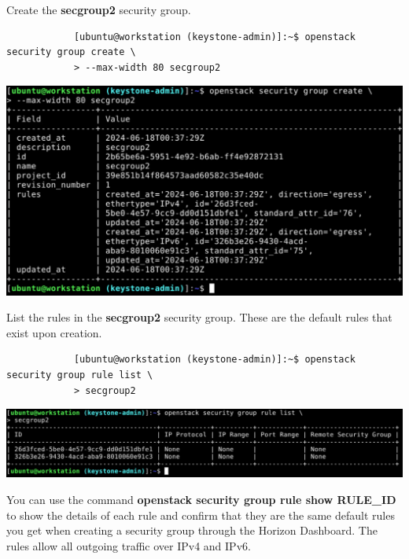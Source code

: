 \documentclass[letterpaper, 12pt]{article}
\begin{document}
\begin{enumerate}
    \begin{labstep}
        Create the \textbf{secgroup2} security group.
        \begin{lstlisting}
            [ubuntu@workstation (keystone-admin)]:~$ openstack security group create \
            > --max-width 80 secgroup2
        \end{lstlisting}

        \begin{center}
            \includegraphics[width=\linewidth]{images/part5/step12.png}
        \end{center}
    \end{labstep}

    \begin{labstep}
        List the rules in the \textbf{secgroup2} security group.
        These are the default rules that exist upon creation.
        \begin{lstlisting}
            [ubuntu@workstation (keystone-admin)]:~$ openstack security group rule list \
            > secgroup2
        \end{lstlisting}

        \begin{center}
            \includegraphics[width=\linewidth]{images/part5/step13.png}
        \end{center}
    \end{labstep}

    \begin{tipbox}
        You can use the command \textbf{openstack security group rule show RULE\_ID} to show the details of each rule and confirm that they are the same default rules you get when creating a security group through the Horizon Dashboard.
        The rules allow all outgoing traffic over IPv4 and IPv6.
    \end{tipbox}


\end{enumerate}
\end{document}
